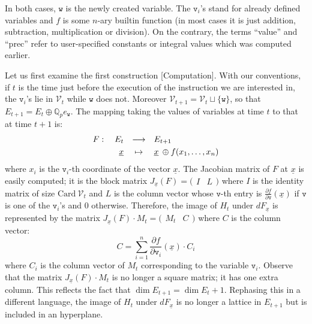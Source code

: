 \documentclass[sigconf]{acmart}
\newcommand{\Q}{\mathbb Q}
\newcommand{\Qp}{\Q_p}
\newcommand{\calV}{\mathcal{V}}
\newcommand{\ttv}{\texttt{v}\xspace}
\newcommand{\ttw}{\texttt{w}\xspace}
\theoremstyle{definition}
\begin{document}
\medskip

\noindent
In both cases, $\ttw$ is the newly created variable. 
The $\ttv_i$'s stand for already defined variables and $f$ is some 
$n$-ary builtin function (in most cases it is just addition, 
subtraction, multiplication or division). On the contrary, the terms 
``value'' and ``prec'' refer to user-specified constants or integral 
values which was computed earlier.

\smallskip

Let us first examine the first construction [Computation].
With our conventions, if $t$ is the time just before the execution of 
the instruction we are interested in, the $\ttv_i$'s lie in $\calV_t$ 
while $\ttw$ does not. Moreover $\calV_{t+1} = \calV_t \sqcup \{\ttw\}$, 
so that $E_{t+1} = E_t \oplus \Qp e_\ttw$.
The mapping taking the values of variables at time $t$ to that at 
time $t{+}1$ is:
$$\begin{array}{rcl}
F: \quad E_t & \longrightarrow & E_{t+1} \smallskip \\
\underline x & \mapsto & \underline x \:\oplus f(x_1, \ldots, x_n)
\end{array}$$
where $x_i$ is the $\ttv_i$-th coordinate of the vector $\underline x$.
The Jacobian matrix of $F$ at $\underline x$ is easily computed; it 
is the block matrix $J_{\underline x}(F) = \big( \begin{matrix} I & L
\end{matrix} \big)$ where $I$ is the identity matrix of size $\text{Card}
\:\calV_t$ and $L$ is the column vector whose $\ttv$-th entry is
$\frac{\partial f}{\partial \ttv} (\underline x)$ if $\ttv$ is one of 
the $\ttv_i$'s and $0$ otherwise.
Therefore, the image of $H_t$ under $dF_{\underline x}$ is represented 
by the matrix $J_{\underline x}(F) \cdot M_t = \big( \begin{matrix} M_t & C
\end{matrix} \big)$ where $C$ is the column vector:
$$C = \sum_{i=1}^n \frac{\partial f}{\partial{\ttv_i}} (\underline x)
\cdot C_i$$
where $C_i$ is the column vector of $M_t$ corresponding to the
variable $\ttv_i$.
Observe that the matrix $J_{\underline x}(F) \cdot M_t$ is no longer a 
square matrix; it has one extra column. This reflects the fact that 
$\dim E_{t+1} = \dim E_t + 1$. Rephasing this in a different language, 
the image of $H_t$ under $dF_{\underline x}$ is no longer a lattice in 
$E_{t+1}$ but is included in an hyperplane.
\end{document}
